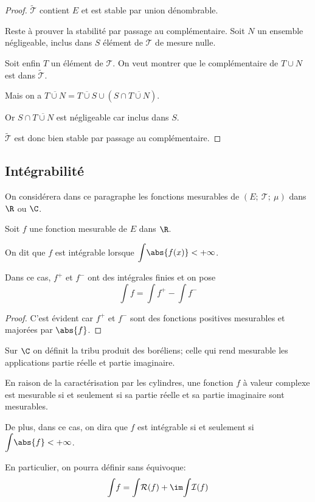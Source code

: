 \begin{proof}
$\tilde{\mathcal{T}}$ contient $E$ et est stable par union dénombrable.

Reste à prouver la stabilité par passage au complémentaire. Soit $N$ un ensemble négligeable, inclus dans $S$ élément de $\mathcal{T}$ de mesure nulle.

Soit enfin $T$ un élément de $\mathcal{T}$. On veut montrer que le complémentaire de $T \cup N$ est dans $\tilde{\mathcal{T}}$.

Mais on a $\overline{T \cup N} = \overline{T \cup S} \cup \left(S \cap \overline{T \cup N}\right)$.

Or $S \cap \overline{T \cup N}$ est négligeable car inclus dans $S$.

$\tilde{\mathcal{T}}$ est donc bien stable par passage au complémentaire.
\end{proof}

\subsection{Intégrabilité}

On considérera dans ce paragraphe les fonctions mesurables de $\left(E;~\mathcal{T};~\mu\right)$ dans $\R$ ou $\C$.

\begin{de}
Soit $f$ une fonction mesurable de $E$ dans $\R$.

On dit que $f$ est intégrable lorsque $\displaystyle{\int} \abs{f(x)} < +\infty$.

Dans ce cas, $f^{+}$ et $f^{-}$ ont des intégrales finies et on pose
\[\displaystyle{\int} f = \displaystyle{\int} f^{+}-\displaystyle{\int} f^{-}\]
\end{de}

\begin{proof}
C'est évident car $f^{+}$ et $f^{-}$ sont des fonctions positives mesurables et majorées par $\abs{f}$.
\end{proof}

\begin{de}
Sur $\C$ on définit la tribu produit des boréliens; celle qui rend mesurable les applications partie réelle et partie imaginaire.

En raison de la caractérisation par les cylindres, une fonction $f$ à valeur complexe est mesurable si et seulement si sa partie réelle et sa partie imaginaire sont mesurables.

De plus, dans ce cas, on dira que $f$ est intégrable si et seulement si $\displaystyle{\int} \abs{f} < +\infty$.

En particulier, on pourra définir sans équivoque:
\[
\displaystyle{\int} f = \displaystyle{\int} \mathcal{R}(f)+\im \displaystyle{\int} \mathcal{I}(f)
\]

\end{de}


